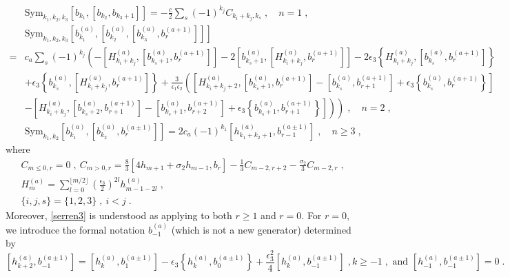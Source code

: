 \documentclass[11pt]{article}
\numberwithin{equation}{section}
\numberwithin{figure}{section}
\numberwithin{table}{section}
\begin{document}
\begin{subequations}
	\begin{align}
		&\mathrm{Sym}_{k_1,k_2,k_3}[b_{k_1},[b_{k_2},b_{k_3+1}]]=-\frac{c}{2}\sum_s(-1)^{k_j}C_{k_i+k_j,k_s}\;,\quad n=1\;,\label{serren1}\\
		&\mathrm{Sym}_{k_1,k_2,k_3}\left[b^{(a)}_{k_1},\left[b^{(a)}_{k_2},\left[b^{(a)}_{k_3},b^{(a+1)}_r\right]\right]\right]\nonumber\\
		=&c_a\sum_s(-1)^{k_j}\left(-\left[H^{(a)}_{k_i+k_j},\left[b^{(a)}_{k_s+1},b^{(a+1)}_r\right]\right]-2\left[b^{(a)}_{k_s+1},\left[H^{(a)}_{k_i+k_j},b^{(a+1)}_r\right]\right]-2\epsilon_3\left\{H^{(a)}_{k_i+k_j},\left[b^{(a)}_{k_s},b^{(a+1)}_r\right]\right\}\right.\nonumber\\
		&+\epsilon_3\left\{b^{(a)}_{k_s},\left[H^{(a)}_{k_i+k_j},b^{(a+1)}_r\right]\right\}+\frac{3}{\epsilon_1\epsilon_2}\left(\left[H^{(a)}_{k_i+k_j+2},\left[b^{(a)}_{k_s+1},b^{(a+1)}_r\right]-\left[b^{(a)}_{k_s},b^{(a+1)}_{r+1}\right]+\epsilon_3\left\{b^{(a)}_{k_s},b^{(a+1)}_r\right\}\right]\right.\nonumber\\
		&\left.\left.-\left[H^{(a)}_{k_i+k_j},\left[b^{(a)}_{k_s+2},b^{(a+1)}_{r+1}\right]-\left[b^{(a)}_{k_s+1},b^{(a+1)}_{r+2}\right]+\epsilon_3\left\{b^{(a)}_{k_s+1},b^{(a+1)}_{r+1}\right\}\right]\right)\right)\;,\quad n=2\;,\label{serren2}\\
		&\mathrm{Sym}_{k_1,k_2}\left[b^{(a)}_{k_1},\left[b^{(a)}_{k_2},b^{(a\pm1)}_r\right]\right]=2c_a(-1)^{k_1}\left[h^{(a)}_{k_1+k_2+1},b^{(a\pm1)}_{r-1}\right]\;,\quad n\geq3\label{serren3}\;,
	\end{align}
\end{subequations}
where
\begin{subequations}
	\begin{align}
	&C_{m\leq0,r}=0\;,~C_{m>0,r}=\frac{8}{3}[4h_{m+1}+\sigma_2h_{m-1},b_r]-\frac{1}{3}C_{m-2,r+2}-\frac{\sigma_2}{3}C_{m-2,r}\;,\\
	&H^{(a)}_m=\sum_{l=0}^{\lfloor m/2\rfloor}\left(\frac{\epsilon_3}{2}\right)^{2l}h^{(a)}_{m-1-2l}\;,\\
	&\{i,j,s\}=\{1,2,3\}\;,~i<j\;.
\end{align}
\end{subequations}
Moreover, \eqref{serren3} is understood as applying to both $r\geq1$ and $r=0$. For $r=0$, we introduce the formal notation $b^{(a)}_{-1}$ (which is not a new generator) determined by
\begin{equation}
	\left[h_{k+2}^{(a)},b_{-1}^{(a\pm1)}\right]=\left[h_k^{(a)},b_1^{(a\pm1)}\right]-\epsilon_3\left\{h_k^{(a)},b_0^{(a\pm1)}\right\}+\frac{\epsilon_3^2}{4}\left[h_k^{(a)},b_{-1}^{(a\pm1)}\right]\;,k\geq-1\;,\text{ and }\left[h_{-1}^{(a)},b_{-1}^{(a\pm1)}\right]=0\;.
\end{equation}
\end{document}
